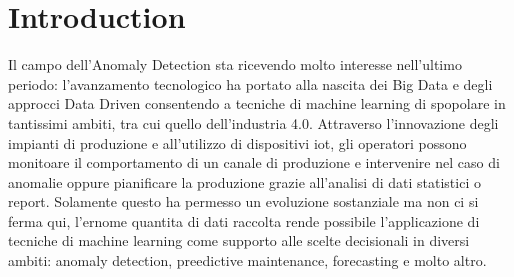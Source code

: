 \chapter{Introduction}
\label{chap:first-chapter-intro}
Il campo dell'Anomaly Detection sta ricevendo molto interesse nell'ultimo periodo: l'avanzamento tecnologico ha portato alla nascita dei Big Data e degli approcci Data Driven consentendo a tecniche di machine learning di spopolare in tantissimi ambiti, tra cui quello dell'industria 4.0.
Attraverso l'innovazione degli impianti di produzione e all'utilizzo di dispositivi iot, gli operatori possono monitoare il comportamento di un canale di produzione e intervenire nel caso di anomalie oppure pianificare la produzione grazie all'analisi di dati statistici o report.
Solamente questo ha permesso un evoluzione sostanziale ma non ci si ferma qui, l'ernome quantita di dati raccolta rende possibile l'applicazione di tecniche di machine learning come supporto alle scelte decisionali in diversi ambiti: anomaly detection, preedictive maintenance, forecasting e molto altro.

